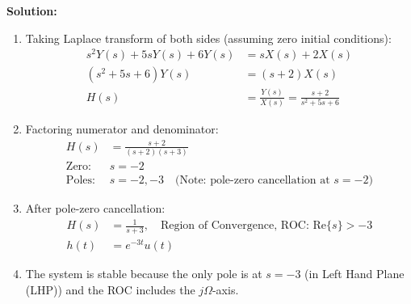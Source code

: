 \documentclass{article}
\begin{document}
\textbf{Solution:}
\begin{enumerate}[label=(\alph*)]
    \item Taking Laplace transform of both sides (assuming zero initial conditions):
    \begin{align*}
        s^2Y(s) + 5sY(s) + 6Y(s) &= sX(s) + 2X(s) \\
        (s^2 + 5s + 6)Y(s) &= (s + 2)X(s) \\
        H(s) &= \frac{Y(s)}{X(s)} = \frac{s + 2}{s^2 + 5s + 6}
    \end{align*}
    
    \item Factoring numerator and denominator:
    \begin{align*}
        H(s) &= \frac{s + 2}{(s + 2)(s + 3)} \\
        \text{Zero: } & s = -2 \\
        \text{Poles: } & s = -2, -3 \quad \text{(Note: pole-zero cancellation at } s = -2)
    \end{align*}
    
    \item After pole-zero cancellation:
    \begin{align*}
        H(s) &= \frac{1}{s + 3}, \quad \text{Region of Convergence, ROC: } \text{Re}\{s\} > -3 \\
        h(t) &= e^{-3t}u(t)
    \end{align*}
    
    \item The system is stable because the only pole is at $s = -3$ (in Left Hand Plane (LHP)) and the ROC includes the $j\Omega$-axis.
    
\end{enumerate}
\end{document}
